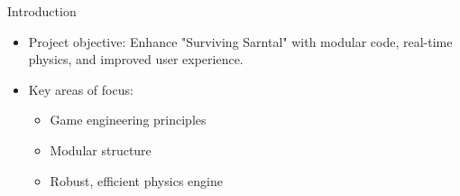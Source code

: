 
\begin{frame}{Introduction}
    \begin{itemize}
        \item Project objective: Enhance "Surviving Sarntal" with modular code, real-time physics, and improved user experience.
        \item Key areas of focus:
        \begin{itemize}
            \item Game engineering principles
            \item Modular structure
            \item Robust, efficient physics engine
        \end{itemize}
    \end{itemize}
\end{frame}